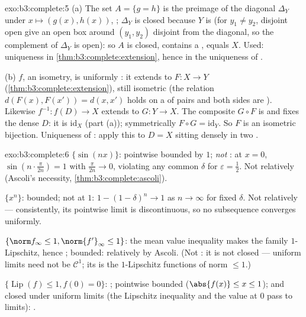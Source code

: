 \begin{solution}{exo:b3:complete:5}
(a) The set $A = \{g = h\}$ is the preimage of the diagonal
$\Delta_Y$ under $x \mapsto (g(x), h(x))$, ; $\Delta_Y$
is closed because $Y$ is  (for $y_1 \neq y_2$,
disjoint open  give an open box around $(y_1,
y_2)$ disjoint from the diagonal, so the complement of
$\Delta_Y$ is open): so $A$ is
closed, contains a , equals $X$. Used: uniqueness in
\cref{thm:b3:complete:extension}, hence in the uniqueness of
.

(b) $f$, an isometry, is uniformly : it extends to
$F\colon X \to Y$ (\cref{thm:b3:complete:extension}), still
isometric (the relation $d(F(x), F(x')) = d(x, x')$ holds on a
 of pairs and both sides are ). Likewise
$f^{-1}\colon f(D) \to X$ extends to $G \colon Y \to X$. The
composite $G \circ F$ is  and fixes the dense $D$: it
is $\mathrm{id}_X$ (part (a)); symmetrically $F \circ G =
\mathrm{id}_Y$. So $F$ is an isometric bijection. Uniqueness of
: apply this to $D = X$ sitting densely in two
.
\end{solution}

\begin{solution}{exo:b3:complete:6}
$\{\sin(nx)\}$: pointwise bounded by $1$; \emph{not}
: at $x = 0$, $\sin(n\cdot\frac{\pi}{2n}) = 1$
with $\frac\pi{2n} \to 0$, violating any common $\delta$ for
$\varepsilon = \frac12$. Not relatively  (Ascoli's
necessity, \cref{thm:b3:complete:ascoli}).

$\{x^n\}$: bounded; not  at $1$: $1 - (1 -
\delta)^n \to 1$ as $n \to \infty$ for fixed $\delta$. Not
relatively  --- consistently, its pointwise limit is
discontinuous, so no subsequence converges uniformly.

$\{\norm f_\infty \leq 1, \norm{f'}_\infty \leq 1\}$: the mean
value inequality makes the family $1$-Lipschitz, hence
; bounded: relatively  by Ascoli. (Not
: it is not closed --- uniform limits need not be
$\mathcal C^1$; its  is the $1$-Lipschitz functions of
norm $\leq 1$.)

$\{\operatorname{Lip}(f) \leq 1, f(0) = 0\}$: ;
pointwise bounded ($\abs{f(x)} \leq x \leq 1$); and closed
under uniform limits (the Lipschitz inequality and the value at
$0$ pass to limits): .
\end{solution}

